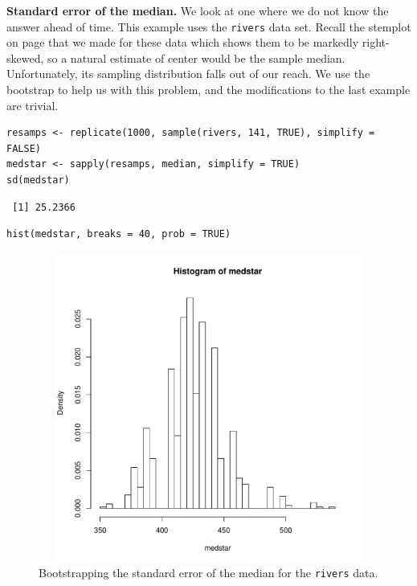 \documentclass[captions=tableheading]{scrbook}
\begin{document}
\begin{example}
\label{exa:Bootstrap-se-median}

\textbf{Standard error of the median.} We look at one where we do not know the answer ahead of time. This example uses the \texttt{rivers} data set. Recall the stemplot on page  that we made for these data which shows them to be markedly right-skewed, so a natural estimate of center would be the sample median. Unfortunately, its sampling distribution falls out of our reach. We use the bootstrap to help us with this problem, and the modifications to the last example are trivial.


\begin{verbatim}
resamps <- replicate(1000, sample(rivers, 141, TRUE), simplify = FALSE)
medstar <- sapply(resamps, median, simplify = TRUE)
sd(medstar)
\end{verbatim}

\begin{verbatim}
 [1] 25.2366
\end{verbatim}



\begin{verbatim}
hist(medstar, breaks = 40, prob = TRUE)
\end{verbatim}



\begin{figure}[th]
    \includegraphics[width=5in, height=4in]{img/Bootstrapping-se-median.pdf}
    \caption[Bootstrapping the standard error of the median for the \texttt{rivers} data]{\small Bootstrapping the standard error of the median for the \texttt{rivers} data.}
    \label{fig:Bootstrapping-se-median}
  \end{figure}


\end{example}
\end{document}
